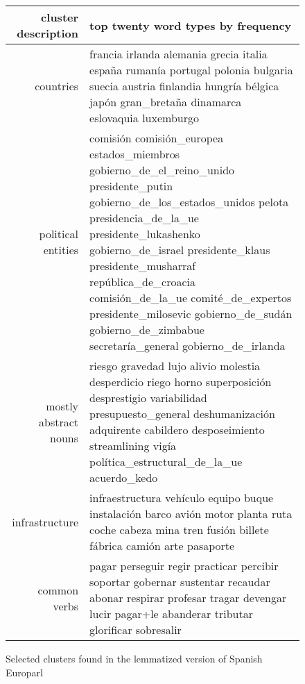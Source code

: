 \begin{figure*}[t!]
  \begin{tabular}{|r|p{10cm}|}
    \hline
    cluster description  & top twenty word types by frequency \\
    \hline
    countries & francia irlanda alemania grecia italia españa rumanía portugal
    polonia bulgaria suecia austria finlandia hungría bélgica japón
    gran\_bretaña dinamarca eslovaquia luxemburgo \\
    \hline
    political entities & comisión comisión\_europea estados\_miembros
    gobierno\_de\_el\_reino\_unido presidente\_putin
    gobierno\_de\_los\_estados\_unidos pelota presidencia\_de\_la\_ue
    presidente\_lukashenko gobierno\_de\_israel presidente\_klaus
    presidente\_musharraf república\_de\_croacia comisión\_de\_la\_ue
    comité\_de\_expertos presidente\_milosevic gobierno\_de\_sudán
    gobierno\_de\_zimbabue secretaría\_general gobierno\_de\_irlanda\\
    \hline
    mostly abstract nouns & riesgo gravedad lujo alivio
    molestia desperdicio riego horno superposición desprestigio variabilidad
    presupuesto\_general deshumanización adquirente cabildero desposeimiento
    streamlining vigía política\_estructural\_de\_la\_ue acuerdo\_kedo \\
    \hline
    infrastructure & infraestructura vehículo equipo buque instalación barco
    avión motor planta ruta coche cabeza mina tren fusión billete fábrica
    camión arte pasaporte \\ 
    \hline
    common verbs & pagar perseguir regir practicar percibir soportar gobernar
    sustentar recaudar abonar respirar profesar tragar devengar lucir pagar+le
    abanderar tributar glorificar sobresalir \\
    \hline
  \end{tabular}
\caption{Selected clusters found in the lemmatized version of Spanish Europarl}
\label{fig:clusters-europarl-lemma}
\end{figure*}

